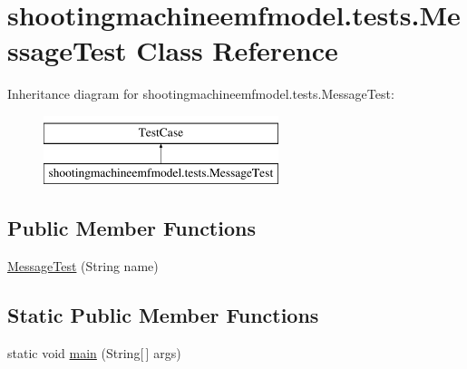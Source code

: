 \hypertarget{classshootingmachineemfmodel_1_1tests_1_1_message_test}{\section{shootingmachineemfmodel.\-tests.\-Message\-Test Class Reference}
\label{classshootingmachineemfmodel_1_1tests_1_1_message_test}
}
Inheritance diagram for shootingmachineemfmodel.\-tests.\-Message\-Test\-:\begin{figure}[H]
\begin{center}
\leavevmode
\includegraphics[height=2.000000cm]{classshootingmachineemfmodel_1_1tests_1_1_message_test}
\end{center}
\end{figure}
\subsection*{Public Member Functions}
\begin{DoxyCompactItemize}
\item 
\hyperlink{classshootingmachineemfmodel_1_1tests_1_1_message_test_a0e2d6e146de19be47cb7571364a7d75d}{Message\-Test} (String name)
\end{DoxyCompactItemize}
\subsection*{Static Public Member Functions}
\begin{DoxyCompactItemize}
\item 
static void \hyperlink{classshootingmachineemfmodel_1_1tests_1_1_message_test_ae556966a483a8ee6fd84052d0a70764a}{main} (String\mbox{[}$\,$\mbox{]} args)
\end{DoxyCompactItemize}
